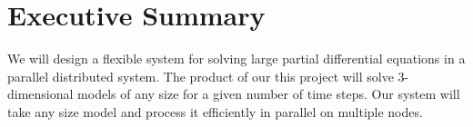 \section*{Executive Summary}
We will design a flexible system for solving large partial differential equations in a parallel distributed system.  The product of our this project will solve 3-dimensional models of any size for a given number of time steps.  Our system will take any size model and process it efficiently in parallel on multiple nodes.

